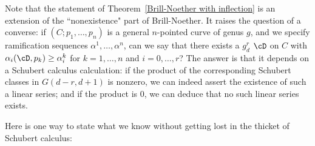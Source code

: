 Note that the statement of Theorem~\ref{Brill-Noether with inflection} is an extension of the ``nonexistence" part of Brill-Noether. It raises the question of a converse: if $(C;p_1,\dots,p_n)$ is a general $n$-pointed curve of genus $g$, and we specify ramification sequences $\alpha^1, \dots, \alpha^n$, can we say that there exists a $g^r_d$ $\cD$ on $C$ with $\alpha_i(\cD, p_k) \geq \alpha^k_i$ for $k=1,\dots,n$ and $i = 0, \dots, r$? The answer is that it depends on a Schubert calculus calculation: if the product of the corresponding Schubert classes in $G(d-r, d+1)$ is nonzero, we can indeed assert the existence of such a linear series; and if the product is 0, we can deduce that no such linear series exists.

Here is one way to state what we know without getting lost in the thicket of Schubert calculus:

